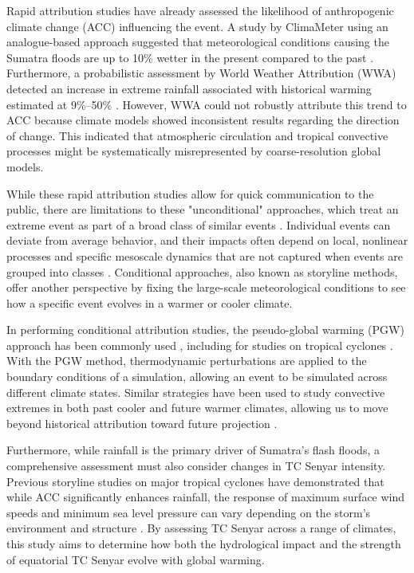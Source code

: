 \documentclass[journal abbreviation, manuscript]{copernicus}
\begin{document}
Rapid attribution studies have already assessed the likelihood of anthropogenic climate change (ACC) influencing the event. A study by ClimaMeter using an analogue-based approach suggested that meteorological conditions causing the Sumatra floods are up to 10\% wetter in the present compared to the past \citep{climameter}. Furthermore, a probabilistic assessment by World Weather Attribution (WWA) detected an increase in extreme rainfall associated with historical warming estimated at 9\%--50\% \citep{wwa}. However, WWA could not robustly attribute this trend to ACC because climate models showed inconsistent results regarding the direction of change. This indicated that atmospheric circulation and tropical convective processes might be systematically misrepresented by coarse-resolution global models.

While these rapid attribution studies allow for quick communication to the public, there are limitations to these "unconditional" approaches, which treat an extreme event as part of a broad class of similar events \citep{lenderink2025pseudo,van2026essential}. Individual events can deviate from average behavior, and their impacts often depend on local, nonlinear processes and specific mesoscale dynamics that are not captured when events are grouped into classes \citep{van2026essential}. Conditional approaches, also known as storyline methods, offer another perspective by fixing the large-scale meteorological conditions to see how a specific event evolves in a warmer or cooler climate.

In performing conditional attribution studies, the pseudo-global warming (PGW) approach has been commonly used \citep{brogli2023pseudo, calvo2026human}, including for studies on tropical cyclones \citep{patricola2018anthropogenic}. With the PGW method, thermodynamic perturbations are applied to the boundary conditions of a simulation, allowing an event to be simulated across different climate states. Similar strategies have been used to study convective extremes in both past cooler and future warmer climates, allowing us to move beyond historical attribution toward future projection \citep{lenderink2025pseudo}.

Furthermore, while rainfall is the primary driver of Sumatra's flash floods, a comprehensive assessment must also consider changes in TC Senyar intensity. Previous storyline studies on major tropical cyclones have demonstrated that while ACC significantly enhances rainfall, the response of maximum surface wind speeds and minimum sea level pressure can vary depending on the storm's environment and structure \citep{patricola2018anthropogenic}. By assessing TC Senyar across a range of climates, this study aims to determine how both the hydrological impact and the strength of equatorial TC Senyar evolve with global warming.
\end{document}
